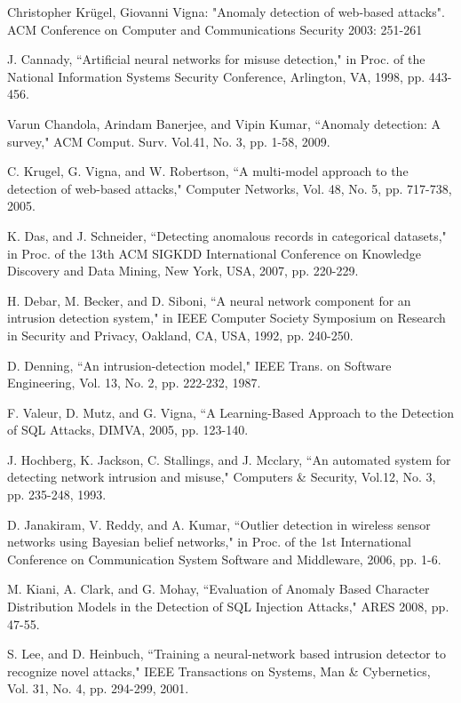 \documentclass[10pt, conference, compsocconf]{IEEEtran}
\begin{document}
\begin{thebibliography}{1}
 Christopher Krügel, Giovanni Vigna: "Anomaly detection of web-based attacks". ACM Conference on Computer and Communications Security 2003: 251-261



 J. Cannady, ``Artificial neural networks for misuse detection," in Proc. of
the National Information Systems Security Conference, Arlington, VA, 1998, pp. 443-456.

 Varun Chandola, Arindam Banerjee, and Vipin Kumar, ``Anomaly detection: A survey," ACM Comput. Surv. Vol.41, No. 3, pp. 1-58, 2009.

	C. Krugel, G. Vigna, and W. Robertson, ``A multi-model approach to the detection of web-based attacks," Computer Networks, Vol. 48, No. 5, pp. 717-738, 2005.

 K. Das, and J. Schneider, ``Detecting anomalous records in categorical datasets," in Proc. of the 13th ACM SIGKDD International Conference on Knowledge Discovery and Data Mining, New
York, USA, 2007, pp. 220-229.

 H. Debar, M. Becker, and D. Siboni, ``A neural network component for
an intrusion detection system," in IEEE Computer Society Symposium on Research
in Security and Privacy, Oakland, CA, USA, 1992, pp. 240-250.

 D. Denning, ``An intrusion-detection model," IEEE Trans. on Software Engineering, Vol. 13, No. 2, pp. 222-232, 1987.


 F. Valeur, D. Mutz, and G. Vigna, ``A Learning-Based Approach to the Detection of SQL Attacks, DIMVA, 2005, pp. 123-140.

 J. Hochberg, K. Jackson, C. Stallings, and J. Mcclary, ``An automated system for detecting network intrusion and misuse," Computers \& Security, Vol.12, No. 3, pp. 235-248, 1993.

 D. Janakiram, V. Reddy, and A. Kumar, ``Outlier detection in wireless sensor networks using Bayesian belief networks," in Proc. of the 1st International Conference on Communication System Software
and Middleware, 2006, pp. 1-6.

 M. Kiani, A. Clark, and G. Mohay, ``Evaluation of Anomaly Based Character Distribution Models in the Detection of SQL Injection Attacks," ARES 2008, pp. 47-55.

 S. Lee, and D. Heinbuch, ``Training a neural-network based intrusion detector
to recognize novel attacks," IEEE Transactions on Systems, Man \& Cybernetics, Vol. 31, No. 4, pp. 294-299, 2001.


\end{thebibliography}
\end{document}

